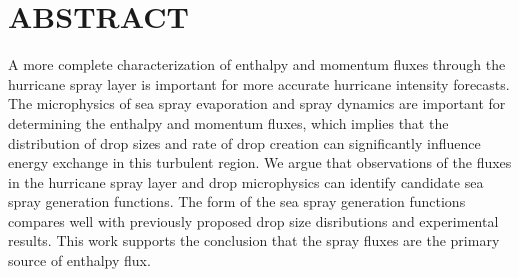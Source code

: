 \documentclass[10pt,a4paper]{article}
\begin{document}
\section{ABSTRACT}
A more complete characterization of enthalpy and momentum fluxes through the hurricane spray layer is important for more accurate hurricane intensity forecasts. The microphysics of sea spray evaporation and spray dynamics are important for determining the enthalpy and momentum fluxes, which implies that the distribution of drop sizes and rate of drop creation can significantly influence energy exchange in this turbulent region. We argue that observations of the fluxes in the hurricane spray layer and drop microphysics can identify candidate sea spray generation functions. The form of the sea spray generation functions compares well with previously proposed drop size disributions and experimental results. This work supports the conclusion that the spray fluxes are the primary source of enthalpy flux.
\end{document}
